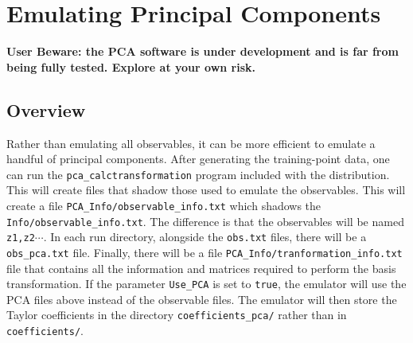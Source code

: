 \documentclass[UserManual.tex]{subfiles}
\begin{document}
\setcounter{section}{5}
\section{Emulating Principal Components}\label{sec:pca}

{\bf User Beware: the PCA software is under development and is far from being fully tested. Explore at your own risk.}

\subsection{Overview}

Rather than emulating all observables, it can be more efficient to emulate a handful of principal components. After generating the training-point data, one can run the {\tt pca\_calctransformation} program included with the distribution. This will create files that shadow those used to emulate the observables. This will create a file {\tt PCA\_Info/observable\_info.txt} which shadows the  {\tt Info/observable\_info.txt}. The difference is that the observables will be named {\tt z1,z2}$\cdots$. In each run directory, alongside the {\tt obs.txt} files, there will be a {\tt obs\_pca.txt} file. Finally, there will be a file {\tt PCA\_Info/tranformation\_info.txt} file that contains all the information and matrices required to perform the basis transformation. If the parameter {\tt Use\_PCA} is set to {\tt true}, the emulator will use the PCA files above instead of the observable files. The emulator will then store the Taylor coefficients in the directory {\tt coefficients\_pca/} rather than in {\tt coefficients/}. 
\end{document}
